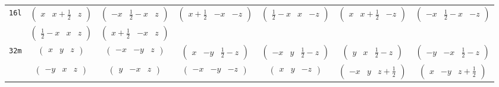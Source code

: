 \documentclass[fleqn,9pt,landscape]{jsarticle}
\begin{document}
\begin{center}
\begin{longtable}{ccccccc}
{\tt 16l} & $ \begin{pmatrix} x & x + \frac{1}{2} & z \end{pmatrix} $ & $ \begin{pmatrix} - x & \frac{1}{2} - x & z \end{pmatrix} $ & $ \begin{pmatrix} x + \frac{1}{2} & - x & - z \end{pmatrix} $ & $ \begin{pmatrix} \frac{1}{2} - x & x & - z \end{pmatrix} $ & $ \begin{pmatrix} x & x + \frac{1}{2} & - z \end{pmatrix} $ & $ \begin{pmatrix} - x & \frac{1}{2} - x & - z \end{pmatrix} $ \\
& $ \begin{pmatrix} \frac{1}{2} - x & x & z \end{pmatrix} $ & $ \begin{pmatrix} x + \frac{1}{2} & - x & z \end{pmatrix} $ & $  $ & $  $ & $  $ & $  $ \\ \hline
{\tt 32m} & $ \begin{pmatrix} x & y & z \end{pmatrix} $ & $ \begin{pmatrix} - x & - y & z \end{pmatrix} $ & $ \begin{pmatrix} x & - y & \frac{1}{2} - z \end{pmatrix} $ & $ \begin{pmatrix} - x & y & \frac{1}{2} - z \end{pmatrix} $ & $ \begin{pmatrix} y & x & \frac{1}{2} - z \end{pmatrix} $ & $ \begin{pmatrix} - y & - x & \frac{1}{2} - z \end{pmatrix} $ \\
& $ \begin{pmatrix} - y & x & z \end{pmatrix} $ & $ \begin{pmatrix} y & - x & z \end{pmatrix} $ & $ \begin{pmatrix} - x & - y & - z \end{pmatrix} $ & $ \begin{pmatrix} x & y & - z \end{pmatrix} $ & $ \begin{pmatrix} - x & y & z + \frac{1}{2} \end{pmatrix} $ & $ \begin{pmatrix} x & - y & z + \frac{1}{2} \end{pmatrix} $ \\

\end{longtable}
\end{center}
\end{document}
